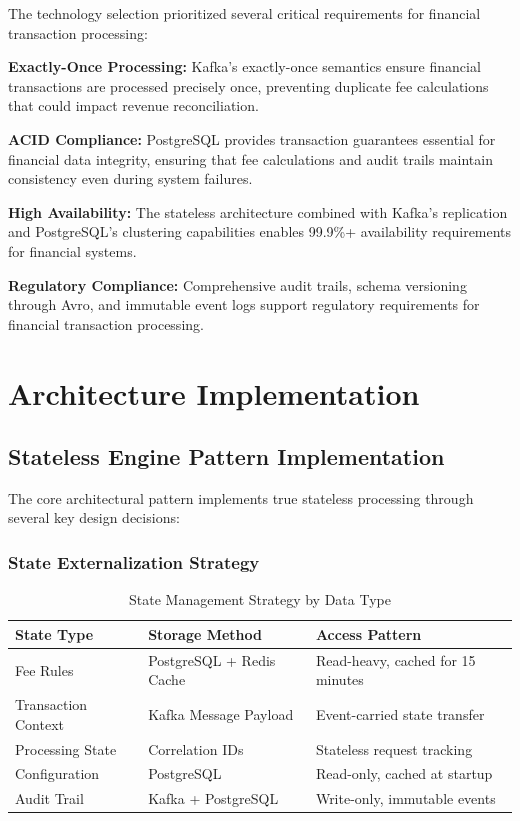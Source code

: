 The technology selection prioritized several critical requirements for financial transaction processing:

\textbf{Exactly-Once Processing:} Kafka's exactly-once semantics ensure financial transactions are processed precisely once, preventing duplicate fee calculations that could impact revenue reconciliation.

\textbf{ACID Compliance:} PostgreSQL provides transaction guarantees essential for financial data integrity, ensuring that fee calculations and audit trails maintain consistency even during system failures.

\textbf{High Availability:} The stateless architecture combined with Kafka's replication and PostgreSQL's clustering capabilities enables 99.9\%+ availability requirements for financial systems.

\textbf{Regulatory Compliance:} Comprehensive audit trails, schema versioning through Avro, and immutable event logs support regulatory requirements for financial transaction processing.

\section{Architecture Implementation}

\subsection{Stateless Engine Pattern Implementation}

The core architectural pattern implements true stateless processing through several key design decisions:

\subsubsection{State Externalization Strategy}

\begin{table}[h]
\centering
\begin{tabular}{|l|l|l|}
\hline
\textbf{State Type} & \textbf{Storage Method} & \textbf{Access Pattern} \\
\hline
Fee Rules & PostgreSQL + Redis Cache & Read-heavy, cached for 15 minutes \\
Transaction Context & Kafka Message Payload & Event-carried state transfer \\
Processing State & Correlation IDs & Stateless request tracking \\
Configuration & PostgreSQL & Read-only, cached at startup \\
Audit Trail & Kafka + PostgreSQL & Write-only, immutable events \\
\hline
\end{tabular}
\caption{State Management Strategy by Data Type}
\end{table}


